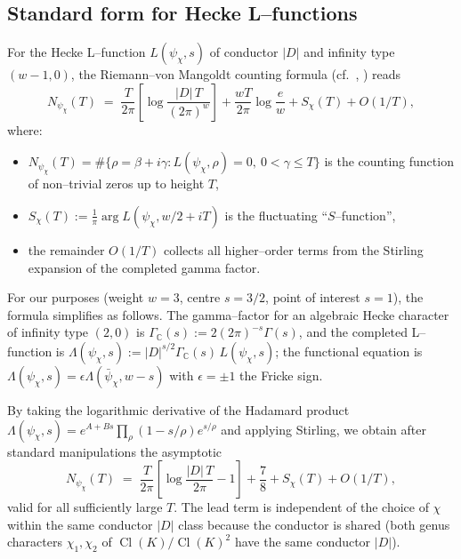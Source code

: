 \documentclass[11pt]{amsart}
\theoremstyle{definition}
\theoremstyle{remark}
\DeclareMathOperator{\Cl}{Cl}
\newcommand{\C}{\mathbb{C}}
\begin{document}
\subsection{Standard form for Hecke L--functions}\label{ssec:RvM}
For the Hecke L--function \(L(\psi_\chi, s)\) of conductor \(|D|\)
and infinity type \((w{-}1, 0)\), the Riemann--von Mangoldt counting
formula
(cf.\ \cite[Ch.~5]{IwaniecKowalski2004},
\cite[Thm.~5.8]{Murty2007}) reads
\begin{equation}\label{eq:RvM-formal}
  N_{\psi_\chi}(T)
   \;=\;
   \frac{T}{2\pi}\!\left[ \log\frac{|D|\,T}{(2\pi)^{w}} \right]
   + \frac{w T}{2\pi} \log\frac{e}{w}
   + S_\chi(T) + O(1/T) ,
\end{equation}
where:
\begin{itemize}
  \item \(N_{\psi_\chi}(T) = \#\{\rho = \beta + i\gamma :
        L(\psi_\chi, \rho) = 0,\ 0 < \gamma \le T\}\) is the counting
        function of non--trivial zeros up to height \(T\),
  \item \(S_\chi(T) := \tfrac{1}{\pi} \arg L(\psi_\chi, w/2 + iT)\)
        is the fluctuating ``\(S\)--function'',
  \item the remainder \(O(1/T)\) collects all higher--order terms from
        the Stirling expansion of the completed gamma factor.
\end{itemize}

For our purposes (weight \(w = 3\), centre \(s = 3/2\), point of
interest \(s = 1\)), the formula simplifies as follows. The
gamma--factor for an algebraic Hecke character of infinity type
\((2, 0)\) is \(\Gamma_\C(s) := 2(2\pi)^{-s}\Gamma(s)\), and the
completed L--function is
\(\Lambda(\psi_\chi, s) := |D|^{s/2}\Gamma_\C(s)\,
L(\psi_\chi, s)\); the functional equation is
\(\Lambda(\psi_\chi, s) = \epsilon \Lambda(\bar\psi_\chi, w - s)\)
with \(\epsilon = \pm 1\) the Fricke sign.

By taking the logarithmic derivative of the Hadamard product
\(\Lambda(\psi_\chi, s) = e^{A + Bs}\prod_\rho(1 - s/\rho)e^{s/\rho}\)
and applying Stirling, we obtain after standard manipulations the
asymptotic
\begin{equation}\label{eq:RvM-w3}
  N_{\psi_\chi}(T)
   \;=\;
   \frac{T}{2\pi}\!\left[ \log\frac{|D|\,T}{2\pi} - 1 \right]
   + \frac{7}{8} + S_\chi(T) + O(1/T) ,
\end{equation}
valid for all sufficiently large \(T\). The lead term is independent
of the choice of \(\chi\) within the same conductor \(|D|\) class
because the conductor is shared (both genus characters
\(\chi_1, \chi_2\) of \(\Cl(K)/\Cl(K)^2\) have the same conductor
\(|D|\)).
\end{document}
